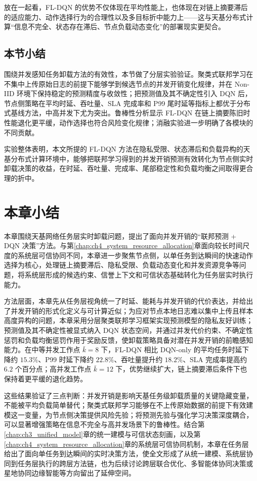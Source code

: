 放在一起看，FL-DQN 的优势不仅体现在平均性能上，也体现在对链上摘要滞后的适应能力、动作选择行为的合理性以及多目标折中能力上——这与天基分布式计算“信息不完全、状态存在滞后、节点负载动态变化”的部署现实更契合。

\subsection{本节小结}
\label{subsec:ch5_exp_summary}

围绕并发感知任务卸载方法的有效性，本节做了分层实验验证。聚类式联邦学习在不集中上传原始日志的前提下能够学到候选节点的并发开销变化规律，并在 Non-IID 环境下保持稳定的预测精度与收敛性；把预测值及其不确定性引入 DQN 后，节点侧策略在平均时延、吞吐量、SLA 完成率和 P99 尾时延等指标上都优于分布式基线方法，中高并发下尤为突出。鲁棒性分析显示 FL-DQN 在链上摘要陈旧时性能退化更平缓，动作选择也符合风险变化规律；消融实验进一步明确了各模块的不同贡献。

实验整体表明，本文所提的 FL-DQN 方法在隐私受限、状态滞后和负载异构的天基分布式计算环境中，能够把联邦学习得到的并发开销预测有效转化为节点侧实时卸载决策的收益，在时延、吞吐量、完成率、尾部稳定性和负载均衡之间取得更合理的折中。

\section{本章小结}
\label{sec:ch5_conclusion}

本章围绕天基网络任务层实时卸载问题，提出了面向并发开销的“联邦预测 + DQN 决策”方法。与第\ref{chap:ch4_system_resource_allocation}章面向较长时间尺度的系统层可信协同不同，本章进一步聚焦节点侧，以单任务到达瞬间的快速动作选择为核心，处理链上摘要滞后、隐私受限、负载动态变化和并发资源竞争等问题，将系统层形成的候选约束、信誉上下文和可信状态基础转化为任务层实时执行能力。

方法层面，本章先从任务层视角统一了时延、能耗与并发开销的代价表达，并给出了并发开销的形式化定义与可计算近似；为应对节点本地日志难以集中上传且样本高度异构的问题，本章采用分层聚类联邦学习框架实现预测模型的隐私友好训练；预测值及其不确定性被显式纳入 DQN 状态空间，并通过并发代价约束、不确定性惩罚和负载均衡惩罚作用于奖励反馈，使卸载策略具备对潜在并发开销的前瞻感知能力。在中等并发工作点 $\bar{k}=8$ 下，FL-DQN 相比 DQN-only 的平均任务时延下降约 $15.3\%$、P99 时延下降约 $22.8\%$、吞吐量提升约 $18.2\%$、SLA 完成率提高约 $6.2$ 个百分点；高并发工作点 $\bar{k}=12$ 下，优势继续扩大，链上摘要滞后条件下也保持着更平缓的退化趋势。

这些结果验证了三点判断：并发开销是影响天基任务级卸载质量的关键隐藏变量，不能被平均负载简单替代；聚类式联邦学习能够在不上传原始数据的前提下有效建模这一变量，为节点侧决策提供风险先验；将预测先验与强化学习决策深度耦合，可以显著增强策略在信息不完全与高并发场景下的鲁棒性。结合第\ref{chap:ch3_unified_model}章的统一建模与可信状态刻画，以及第\ref{chap:ch4_system_resource_allocation}章的系统层可信协同机制，本章在任务层给出了面向单任务到达瞬间的实时决策方法，使全文形成了从统一建模、系统层协同到任务层执行的跨层方法链，也为后续讨论跨层联合优化、多智能体协同决策或星地协同边缘智能等方向留出了延伸空间。

